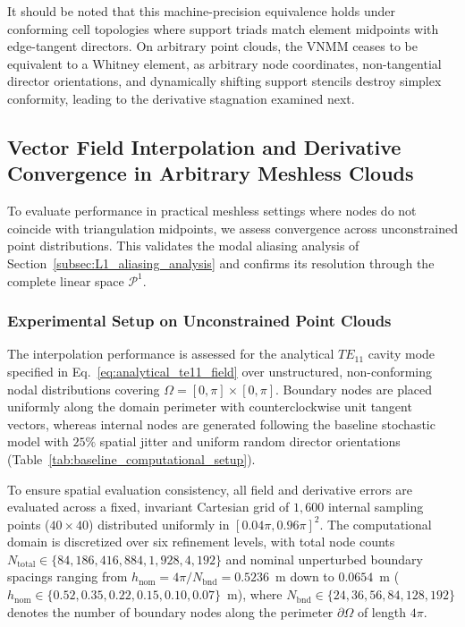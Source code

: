 \documentclass[preprint,12pt]{elsarticle}
\begin{document}
It should be noted that this machine-precision equivalence holds under conforming cell topologies where support triads match element midpoints with edge-tangent directors. On arbitrary point clouds, the VNMM ceases to be equivalent to a Whitney element, as arbitrary node coordinates, non-tangential director orientations, and dynamically shifting support stencils destroy simplex conformity, leading to the derivative stagnation examined next.


\subsection{Vector Field Interpolation and Derivative Convergence in Arbitrary Meshless Clouds}
\label{subsec:arbitrary_meshless_interpolation}

To evaluate performance in practical meshless settings where nodes do not coincide with triangulation midpoints, we assess convergence across unconstrained point distributions. This validates the modal aliasing analysis of Section~\ref{subsec:L1_aliasing_analysis} and confirms its resolution through the complete linear space $\mathcal{P}^1$.
\subsubsection{Experimental Setup on Unconstrained Point Clouds}
The interpolation performance is assessed for the analytical $TE_{11}$ cavity mode specified in Eq.~\eqref{eq:analytical_te11_field} over unstructured, non-conforming nodal distributions covering $\Omega = [0, \pi] \times [0, \pi]$. Boundary nodes are placed uniformly along the domain perimeter with counterclockwise unit tangent vectors, whereas internal nodes are generated following the baseline stochastic model with $25\%$ spatial jitter and uniform random director orientations (Table~\ref{tab:baseline_computational_setup}).

To ensure spatial evaluation consistency, all field and derivative errors are evaluated across a fixed, invariant Cartesian grid of $1{,}600$ internal sampling points ($40 \times 40$) distributed uniformly in $[0.04\pi, 0.96\pi]^2$. The computational domain is discretized over six refinement levels, with total node counts $N_{\mathrm{total}} \in \{84, 186, 416, 884, 1{,}928, 4{,}192\}$ and nominal unperturbed boundary spacings ranging from $h_{\mathrm{nom}} = 4\pi / N_{\mathrm{bnd}} = 0.5236$~m down to $0.0654$~m ($h_{\mathrm{nom}} \in \{0.52, 0.35, 0.22, 0.15, 0.10, 0.07\}$~m), where $N_{\mathrm{bnd}} \in \{24, 36, 56, 84, 128, 192\}$ denotes the number of boundary nodes along the perimeter $\partial\Omega$ of length $4\pi$.
\end{document}
